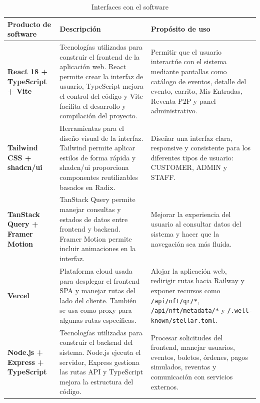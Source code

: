 \documentclass[12pt,letterpaper]{article}
\begin{document}
\begin{table}[htbp]
\centering
\scriptsize
\caption{Interfaces con el software}
\label{tab:interfaces_software}

\begin{tabularx}{\textwidth}{|p{3.5cm}|X|X|}
\hline
\textbf{Producto de software} & \textbf{Descripción} & \textbf{Propósito de uso} \\ \hline

\textbf{React 18 + TypeScript + Vite} &
Tecnologías utilizadas para construir el frontend de la aplicación web. React permite crear la interfaz de usuario, TypeScript mejora el control del código y Vite facilita el desarrollo y compilación del proyecto. &
Permitir que el usuario interactúe con el sistema mediante pantallas como catálogo de eventos, detalle del evento, carrito, Mis Entradas, Reventa P2P y panel administrativo. \\ \hline

\textbf{Tailwind CSS + shadcn/ui} &
Herramientas para el diseño visual de la interfaz. Tailwind permite aplicar estilos de forma rápida y shadcn/ui proporciona componentes reutilizables basados en Radix. &
Diseñar una interfaz clara, responsive y consistente para los diferentes tipos de usuario: CUSTOMER, ADMIN y STAFF. \\ \hline

\textbf{TanStack Query + Framer Motion} &
TanStack Query permite manejar consultas y estados de datos entre frontend y backend. Framer Motion permite incluir animaciones en la interfaz. &
Mejorar la experiencia del usuario al consultar datos del sistema y hacer que la navegación sea más fluida. \\ \hline

\textbf{Vercel} &
Plataforma cloud usada para desplegar el frontend SPA y manejar rutas del lado del cliente. También se usa como proxy para algunas rutas específicas. &
Alojar la aplicación web, redirigir rutas hacia Railway y exponer recursos como \texttt{/api/nft/qr/*}, \texttt{/api/nft/metadata/*} y \texttt{/.well-known/stellar.toml}. \\ \hline

\textbf{Node.js + Express + TypeScript} &
Tecnologías utilizadas para construir el backend del sistema. Node.js ejecuta el servidor, Express gestiona las rutas API y TypeScript mejora la estructura del código. &
Procesar solicitudes del frontend, manejar usuarios, eventos, boletos, órdenes, pagos simulados, reventas y comunicación con servicios externos. \\ \hline


\end{tabularx}
\end{table}
\end{document}
